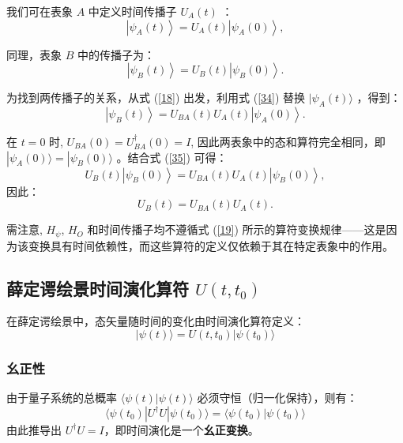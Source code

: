 我们可在表象 $ A $ 中定义时间传播子 $ U_A(t) $ ：
\begin{equation}
	\left|\psi_A(t)\right\rangle = U_A(t) \left|\psi_A(0)\right\rangle,\label{34}
\end{equation}

同理，表象 $ B $ 中的传播子为：
\begin{equation}
	\left|\psi_B(t)\right\rangle = U_B(t) \left|\psi_B(0)\right\rangle.\label{35}
\end{equation}

为找到两传播子的关系，从式 (\ref{18}) 出发，利用式 (\ref{34}) 替换 $ |\psi_A(t)\rangle $ ，得到：
\begin{equation}
	\left|\psi_B(t)\right\rangle = U_{BA}(t) U_A(t) \left|\psi_A(0)\right\rangle.
\end{equation}

在 $ t=0 $ 时, $ U_{BA}(0) = U_{BA}^\dagger(0) = I $, 因此两表象中的态和算符完全相同，即 $ |\psi_A(0)\rangle = |\psi_B(0)\rangle $ 。结合式 (\ref{35}) 可得：
\begin{equation}
	U_B(t) \left|\psi_B(0)\right\rangle = U_{BA}(t) U_A(t) \left|\psi_B(0)\right\rangle,
\end{equation}
因此：
\begin{equation}
	U_B(t) = U_{BA}(t) U_A(t).
\end{equation}

需注意, $ H_\psi $, $ H_O $ 和时间传播子均不遵循式 (\ref{19}) 所示的算符变换规律——这是因为该变换具有时间依赖性，而这些算符的定义仅依赖于其在特定表象中的作用。

\subsection{薛定谔绘景时间演化算符 $U(t, t_0)$}

在薛定谔绘景中，态矢量随时间的变化由时间演化算符定义：
\begin{equation}
	|\psi(t)\rangle = U(t, t_0) |\psi(t_0)\rangle
\end{equation}

\subsubsection{幺正性}
由于量子系统的总概率 $\langle \psi(t) | \psi(t) \rangle$ 必须守恒（归一化保持），则有：
\begin{equation}
	\langle \psi(t_0) | U^\dagger U | \psi(t_0) \rangle = \langle \psi(t_0) | \psi(t_0) \rangle
\end{equation}
由此推导出 $U^\dagger U = I$，即时间演化是一个\textbf{幺正变换}。

